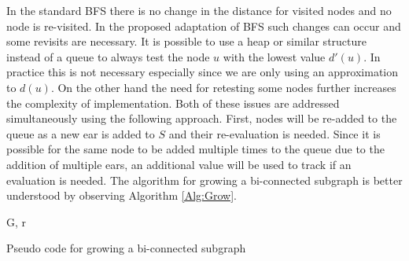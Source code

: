 In the standard BFS there is no change in the distance for visited nodes and no node is re-visited. In the proposed adaptation of BFS such changes can occur and some revisits are necessary. It is possible to use a heap or similar structure instead of a queue to always test the node $u$ with the lowest value $d'(u)$. In practice this is not necessary especially since we are only using an approximation to $d(u)$. On the other hand the need for retesting some nodes further increases the complexity of implementation. Both of these issues are addressed simultaneously using the following approach. First, nodes will be re-added to the queue as a new ear is added to $S$ and their re-evaluation is needed. Since it is possible for the same node to be added multiple times to the queue due to the addition of multiple ears, an additional value will be used to track if an evaluation is needed. The algorithm for growing a bi-connected subgraph is better understood by observing Algorithm \ref{Alg:Grow}.
\begin{algorithm}
\begin{algorithmic}
 {G, r}

  
 	\EndIf
 \Else
 \EndIf
 \EndFor
  \EndIf
\EndWhile
\EndProcedure
\end{algorithmic}
\caption{\label{Alg:Grow} Pseudo code for growing a bi-connected subgraph}
\end{algorithm}


